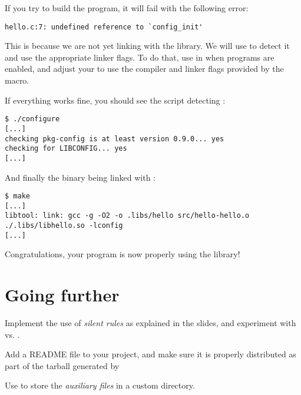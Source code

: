 If you try to build the program, it will fail with the following
error:

\begin{verbatim}
hello.c:7: undefined reference to `config_init'
\end{verbatim}

This is because we are not yet linking with the 
library. We will use  to detect it and use the
appropriate linker flags. To do that, use  in
 when programs are enabled, and adjust your
 to use the compiler and linker flags provided by
the  macro.

If everything works fine, you should see the  script
detecting :

\begin{verbatim}
$ ./configure
[...]
checking pkg-config is at least version 0.9.0... yes
checking for LIBCONFIG... yes
[...]
\end{verbatim}

And finally the  binary being linked with
:

\begin{verbatim}
$ make
[...]
libtool: link: gcc -g -O2 -o .libs/hello src/hello-hello.o  ./.libs/libhello.so -lconfig
[...]
\end{verbatim}

Congratulations, your program is now properly using the
 library!

\section{Going further}

Implement the use of {\em silent rules} as explained in the slides,
and experiment with  vs. .

Add a README file to your project, and make sure it is properly
distributed as part of the tarball generated by 

Use  to store the {\em auxiliary files} in a
custom directory.
